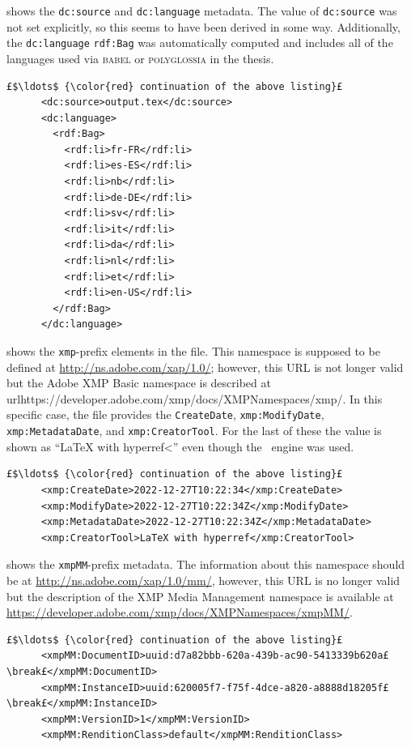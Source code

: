  shows the \texttt{dc:source} and \texttt{dc:language} metadata. The value of \texttt{dc:source} was not set explicitly, so this seems to have been derived in some way. Additionally, the \texttt{dc:language} \texttt{rdf:Bag} was automatically computed and includes all of the languages used via \textsc{babel} or \textsc{polyglossia} in the thesis.
\begin{lstlisting}[style=myXML,
caption={The \texttt{dc:source} and \texttt{dc:language} metadata embedded in a PDF file}, label={lst:pdfinfoOutputPart11}]
£$\ldots$ {\color{red} continuation of the above listing}£ 
      <dc:source>output.tex</dc:source>
      <dc:language>
        <rdf:Bag>
          <rdf:li>fr-FR</rdf:li>
          <rdf:li>es-ES</rdf:li>
          <rdf:li>nb</rdf:li>
          <rdf:li>de-DE</rdf:li>
          <rdf:li>sv</rdf:li>
          <rdf:li>it</rdf:li>
          <rdf:li>da</rdf:li>
          <rdf:li>nl</rdf:li>
          <rdf:li>et</rdf:li>
          <rdf:li>en-US</rdf:li>
        </rdf:Bag>
      </dc:language>
\end{lstlisting}

 shows the \texttt{xmp}-prefix elements in the file. This namespace is supposed to be defined at \url{http://ns.adobe.com/xap/1.0/}; however, this URL is not longer valid but the Adobe XMP Basic namespace is described at url{https://developer.adobe.com/xmp/docs/XMPNamespaces/xmp/}. In this specific case, the file provides the \texttt{CreateDate}, \texttt{xmp:ModifyDate}, \texttt{xmp:MetadataDate}, and \texttt{xmp:CreatorTool}. For the last of these the value is shown as ``LaTeX with hyperref<'' even though the \XeLaTeX~engine was used.
\begin{lstlisting}[style=myXML,
caption={The final set of metadata embedded in a PDF file}, label={lst:pdfinfoOutputPart12}]
£$\ldots$ {\color{red} continuation of the above listing}£ 
      <xmp:CreateDate>2022-12-27T10:22:34</xmp:CreateDate>
      <xmp:ModifyDate>2022-12-27T10:22:34Z</xmp:ModifyDate>
      <xmp:MetadataDate>2022-12-27T10:22:34Z</xmp:MetadataDate>
      <xmp:CreatorTool>LaTeX with hyperref</xmp:CreatorTool>
\end{lstlisting}

 shows the \texttt{xmpMM}-prefix metadata. The information about this namespace should be at \url{http://ns.adobe.com/xap/1.0/mm/}, however, this URL is no longer valid but the description of the XMP Media Management namespace is available at \url{https://developer.adobe.com/xmp/docs/XMPNamespaces/xmpMM/}.
\begin{lstlisting}[style=myXML,
caption={The \texttt{xmpMM}-prefix metadata embedded in a PDF file (two of the lines have been manually broken to fit the test in the margins)}, label={lst:pdfinfoOutputPart13}]
£$\ldots$ {\color{red} continuation of the above listing}£ 
      <xmpMM:DocumentID>uuid:d7a82bbb-620a-439b-ac90-5413339b620a£\break£</xmpMM:DocumentID>
      <xmpMM:InstanceID>uuid:620005f7-f75f-4dce-a820-a8888d18205f£\break£</xmpMM:InstanceID>
      <xmpMM:VersionID>1</xmpMM:VersionID>
      <xmpMM:RenditionClass>default</xmpMM:RenditionClass>
\end{lstlisting}

